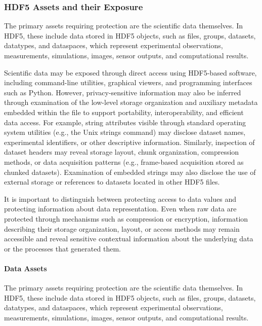 \documentclass[../main.tex]{subfiles}
\begin{document}
\subsubsection{HDF5 Assets and their Exposure}

The primary assets requiring protection are the scientific data themselves.
In HDF5, these include data stored in HDF5 objects, such as files, groups, datasets, datatypes,
and dataspaces, which represent experimental observations, measurements, simulations, images,
sensor outputs, and computational results.

Scientific data may be exposed through direct access using HDF5-based software,
including command-line utilities, graphical viewers, and programming interfaces such as Python.
However, privacy-sensitive information may also be inferred through examination of the 
low-level storage organization and auxiliary metadata embedded within the file to support 
portability, interoperability, and efficient data access. For example, string attributes 
visible through standard operating system utilities (e.g., the Unix strings command) may 
disclose dataset names, experimental identifiers, or other descriptive information. 
Similarly, inspection of dataset headers may reveal storage layout, chunk organization, 
compression methods, or data acquisition patterns (e.g., frame-based acquisition stored 
as chunked datasets). Examination of embedded strings may also disclose the use of 
external storage or references to datasets located in other HDF5 files.

It is important to distinguish between protecting access to data values and protecting information 
about data representation. Even when raw data are protected through mechanisms such as 
compression or encryption, information describing their storage organization, layout, or 
access methods may remain accessible and reveal sensitive contextual information about the 
underlying data or the processes that generated them.

\paragraph{Data Assets}

The primary assets requiring protection are the scientific data themselves. In HDF5, these 
include data stored in HDF5 objects, such as files, groups, datasets, datatypes, and dataspaces, 
which represent experimental observations, measurements, simulations, images, 
sensor outputs, and computational results.
\end{document}
